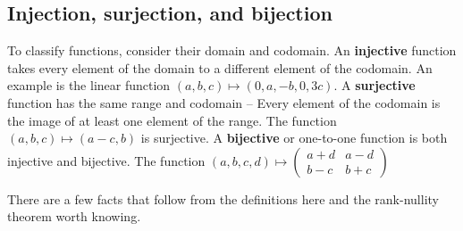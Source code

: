 \documentclass{article}
\begin{document}
        \subsection{Injection, surjection, and bijection}
            To classify functions, consider their domain and codomain. An \textbf{injective} function takes every element of the domain to a different element of the codomain. An example is the linear function $(a,b,c) \mapsto (0, a, -b, 0, 3c)$. 
            A \textbf{surjective} function has the same range and codomain -- Every element of the codomain is the image of at least one element of the range. The function $(a, b, c) \mapsto (a-c, b)$ is surjective.
            A \textbf{bijective} or one-to-one function is both injective and bijective. The function $(a, b, c, d) \mapsto \begin{pmatrix} a + d & a - d \\ b - c & b + c \end{pmatrix}$

            There are a few facts that follow from the definitions here and the rank-nullity theorem worth knowing.
\end{document}

